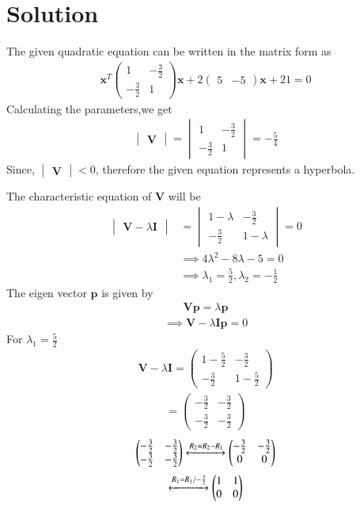 \documentclass[journal,12pt,twocolumn]{IEEEtran}
\newcommand{\myvec}[1]{\ensuremath{\begin{pmatrix}#1\end{pmatrix}}}
\newcommand{\mydet}[1]{\ensuremath{\begin{vmatrix}#1\end{vmatrix}}}
\numberwithin{equation}{subsection}
\let\vec\mathbf
\begin{document}
\section{Solution}
The given quadratic equation can be written in the matrix form as
\begin{align}
    \vec{x}^T\myvec{1&-\frac{3}{2}\\-\frac{3}{2}&1}\vec{x}+2\myvec{5&-5}\vec{x}+21=0\label{eq:1}
\end{align}
Calculating the parameters,we get
\begin{align}
    \mydet{\vec{V}}=\mydet{1&-\frac{3}{2}\\-\frac{3}{2}&1}=-\frac{5}{4}
\end{align}
Since, $\mydet{\vec{V}} < 0$, therefore the given  equation represents a hyperbola.\par
The characteristic equation of $\vec{V}$ will be
\begin{align}
    \mydet{\vec{V}-\lambda\vec{I}}&=\mydet{1-\lambda&-\frac{3}{2}\\-\frac{3}{2}&1-\lambda}=0\\
    &\implies 4\lambda^2-8\lambda-5 =0 \\
   &\implies\lambda_1=\frac{5}{2},\lambda_2=-\frac{1}{2}\label{eq 2}
\end{align}
The eigen vector $\vec{p}$ is given by
\begin{align}
 \vec{V}\vec{p}=\lambda\vec{p}
\end{align}
\begin{align}
  \implies{\vec{V}-\lambda\vec{I}} \vec{p}=0 \label{eq 3} 
\end{align}
For $\lambda_1 = \frac{5}{2} $
\begin{align}
\vec{V}-\lambda\vec{I}= \myvec{1-\frac{5}{2}&-\frac{3}{2}\\-\frac{3}{2}&1-\frac{5}{2}}
    \end{align}
    \begin{align}
 =\myvec{-\frac{3}{2}&-\frac{3}{2}\\-\frac{3}{2}&-\frac{3}{2}}
    \end{align}
    \begin{align}
    \myvec{-\frac{3}{2}&-\frac{3}{2}\\-\frac{3}{2}&-\frac{3}{2}}\xleftrightarrow{R_2=R_2-R_1}\myvec{-\frac{3}{2}&-\frac{3}{2}\\ 0 &0}
\end{align}
 \begin{align}
    \xleftrightarrow{R_1=R_1/-\frac{3}{2}}\myvec{1&1\\ 0 &0}\label {eq 4}
   \end{align}
\end{document}

